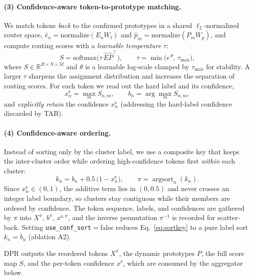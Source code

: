 \paragraph{(3) Confidence-aware token-to-prototype matching.}
We match tokens \emph{back} to the confirmed prototypes in a shared
$\ell_2$-normalized router space, $\hat{e}_n=\mathrm{normalize}(E_n W_t)$ and
$\hat{p}_m=\mathrm{normalize}(P_m W_p)$, and compute routing scores with a
\emph{learnable temperature} $\tau$:
\begin{equation}
S = \mathrm{softmax}\big(\tau\,\hat{E}\hat{P}^{\!\top}\big),
\qquad
\tau = \min\!\big(e^{\,\theta},\,\tau_{\max}\big),
\label{eq:scores}
\end{equation}
where $S\in\mathbb{R}^{B\times N\times M}$ and $\theta$ is a learnable log-scale
clamped by $\tau_{\max}$ for stability.
A larger $\tau$ sharpens the assignment distribution and increases the separation
of routing scores. For each token we read out the hard label and its confidence,
\begin{equation}
x^{\mathrm{s}}_n = \max_m S_{n,m},
\qquad
b_n = \arg\max_m S_{n,m},
\label{eq:belong}
\end{equation}
and \emph{explicitly retain} the confidence $x^{\mathrm{s}}_n$ (addressing
the hard-label confidence discarded by TAB).

\paragraph{(4) Confidence-aware ordering.}
Instead of sorting only by the cluster label, we use a composite key that keeps the
inter-cluster order while ordering high-confidence tokens first \emph{within} each
cluster:
\begin{equation}
k_n = b_n + 0.5\,\big(1 - x^{\mathrm{s}}_n\big),
\qquad
\pi = \operatorname{argsort}_n(k_n).
\label{eq:sortkey}
\end{equation}
Since $x^{\mathrm{s}}_n\in(0,1)$, the additive term lies in $(0,0.5)$ and never
crosses an integer label boundary, so clusters stay contiguous while their members
are ordered by confidence. The token sequence, labels, and confidences are
gathered by $\pi$ into $X^{\pi},\,b^{\pi},\,x^{\mathrm{s},\pi}$, and the inverse
permutation $\pi^{-1}$ is recorded for scatter-back. Setting
\texttt{use\_conf\_sort}$=$false reduces Eq.~\eqref{eq:sortkey} to a pure
label sort $k_n=b_n$ (ablation A2).

DPR outputs the reordered tokens $X^{\pi}$, the dynamic prototypes $P$, the full
score map $S$, and the per-token confidence $x^{\mathrm{s}}$, which are consumed by
the aggregator below.

